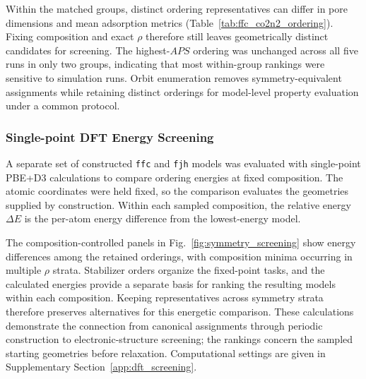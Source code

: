 \documentclass[a5paper, 10pt]{article}
\begin{document}
Within the matched groups, distinct ordering representatives can differ in pore dimensions and mean adsorption metrics (Table~\ref{tab:ffc_co2n2_ordering}). Fixing composition and exact $\rho$ therefore still leaves geometrically distinct candidates for screening. The highest-$APS$ ordering was unchanged across all five runs in only two groups, indicating that most within-group rankings were sensitive to simulation runs. Orbit enumeration removes symmetry-equivalent assignments while retaining distinct orderings for model-level property evaluation under a common protocol.


\subsubsection{Single-point DFT Energy Screening}

A separate set of constructed \texttt{ffc} and \texttt{fjh} models was evaluated with single-point PBE+D3 calculations to compare ordering energies at fixed composition. The atomic coordinates were held fixed, so the comparison evaluates the geometries supplied by construction. Within each sampled composition, the relative energy $\Delta E$ is the per-atom energy difference from the lowest-energy model.

The composition-controlled panels in Fig.~\ref{fig:symmetry_screening} show energy differences among the retained orderings, with composition minima occurring in multiple $\rho$ strata. Stabilizer orders organize the fixed-point tasks, and the calculated energies provide a separate basis for ranking the resulting models within each composition. Keeping representatives across symmetry strata therefore preserves alternatives for this energetic comparison. These calculations demonstrate the connection from canonical assignments through periodic construction to electronic-structure screening; the rankings concern the sampled starting geometries before relaxation. Computational settings are given in Supplementary Section~\ref{app:dft_screening}.
\end{document}

